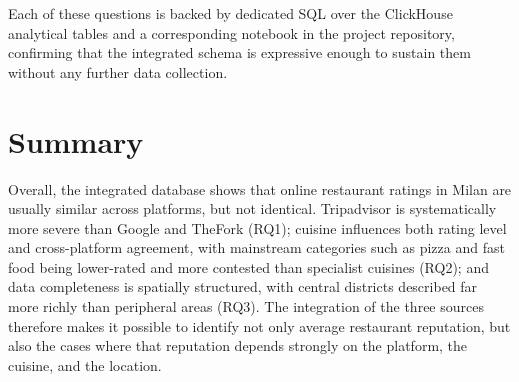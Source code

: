 Each of these questions is backed by dedicated SQL over the ClickHouse analytical
tables and a corresponding notebook in the project repository, confirming that the
integrated schema is expressive enough to sustain them without any further data
collection.

\section{Summary}

Overall, the integrated database shows that online restaurant ratings in Milan
are usually similar across platforms, but not identical. Tripadvisor is
systematically more severe than Google and TheFork (RQ1); cuisine influences both
rating level and cross-platform agreement, with mainstream categories such as
pizza and fast food being lower-rated and more contested than specialist cuisines
(RQ2); and data completeness is spatially structured, with central districts
described far more richly than peripheral areas (RQ3). The integration of the
three sources therefore makes it possible to identify not only average restaurant
reputation, but also the cases where that reputation depends strongly on the
platform, the cuisine, and the location.
